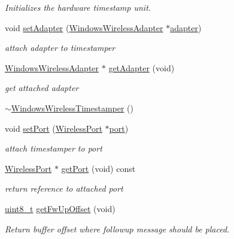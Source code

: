 \begin{DoxyCompactItemize}
\begin{DoxyCompactList}\small\item\em Initializes the hardware timestamp unit. \end{DoxyCompactList}\item 
void \hyperlink{class_windows_wireless_timestamper_a1f7ea4e95e4cc9f354959a0d4ac6d5c0}{set\+Adapter} (\hyperlink{class_windows_wireless_adapter}{Windows\+Wireless\+Adapter} $\ast$\hyperlink{structadapter}{adapter})
\begin{DoxyCompactList}\small\item\em attach adapter to timestamper \end{DoxyCompactList}\item 
\hyperlink{class_windows_wireless_adapter}{Windows\+Wireless\+Adapter} $\ast$ \hyperlink{class_windows_wireless_timestamper_ac918d1eb6ce6ae0cd6705bd56391182a}{get\+Adapter} (void)
\begin{DoxyCompactList}\small\item\em get attached adapter \end{DoxyCompactList}\item 
\hyperlink{class_windows_wireless_timestamper_a396d47d2444187857e0334f02fe66b2f}{$\sim$\+Windows\+Wireless\+Timestamper} ()
\item 
void \hyperlink{class_wireless_timestamper_a66e2a2630f5a4667a1e79cbadbc052ac}{set\+Port} (\hyperlink{class_wireless_port}{Wireless\+Port} $\ast$\hyperlink{class_wireless_timestamper_a16e2f76ce8715713c1d3db843c27d2d3}{port})
\begin{DoxyCompactList}\small\item\em attach timestamper to port \end{DoxyCompactList}\item 
\hyperlink{class_wireless_port}{Wireless\+Port} $\ast$ \hyperlink{class_wireless_timestamper_aad42db1d6ccc40f2bebc5ba544d738d8}{get\+Port} (void) const 
\begin{DoxyCompactList}\small\item\em return reference to attached port \end{DoxyCompactList}\item 
\hyperlink{stdint_8h_aba7bc1797add20fe3efdf37ced1182c5}{uint8\+\_\+t} \hyperlink{class_wireless_timestamper_aa3f9c98559377e4d96f78583486f3154}{get\+Fw\+Up\+Offset} (void)
\begin{DoxyCompactList}\small\item\em Return buffer offset where followup message should be placed. \end{DoxyCompactList}\item 

\end{DoxyCompactItemize}
